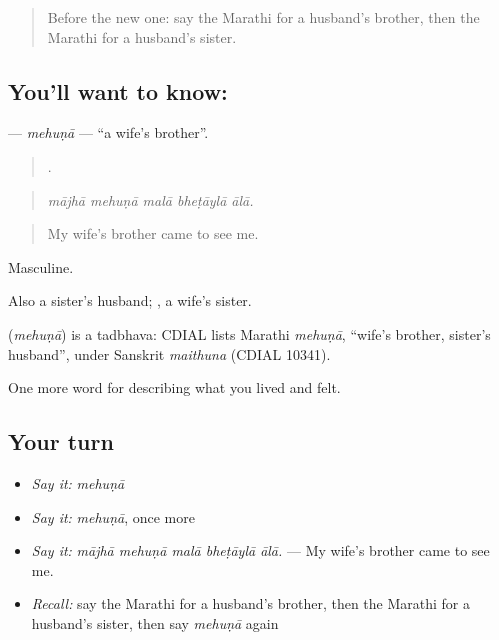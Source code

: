 \label{lesson:MR-C496-mehuna}



\begin{quote}
Before the new one: say the Marathi for a husband's brother, then the Marathi for a husband's sister.
\end{quote}

\subsection*{You'll want to know: }
\textbf{} — \emph{mehuṇā} — \textquotedblleft{}a wife's brother\textquotedblright{}.

\begin{quote}
    .
\end{quote}

\begin{quote}
\emph{mājhā mehuṇā malā bheṭāylā ālā.}
\end{quote}

\begin{quote}
My wife's brother came to see me.
\end{quote}

Masculine.

Also a sister's husband; , a wife's sister.

\begin{cousinweb}
\textbf{} (\emph{mehuṇā}) is a tadbhava: CDIAL lists Marathi \emph{mehuṇā}, \textquotedblleft{}wife's brother, sister's husband\textquotedblright{}, under Sanskrit \emph{maithuna} (CDIAL 10341).
\end{cousinweb}

\begin{grammarlens}[title={What you've built}]
One more word for describing what you lived and felt.
\end{grammarlens}

\subsection*{Your turn}
\begin{itemize}
\raggedright
  \item \emph{Say it:} \emph{mehuṇā}
  \item \emph{Say it:} \emph{mehuṇā}, once more
  \item \emph{Say it:} \emph{mājhā mehuṇā malā bheṭāylā ālā.} — My wife's brother came to see me.
  \item \emph{Recall:} say the Marathi for a husband's brother, then the Marathi for a husband's sister, then say \emph{mehuṇā} again
\end{itemize}

